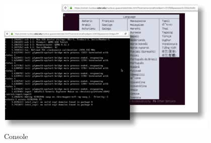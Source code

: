 \begin{figure}[!h]

  \centering 
    \includegraphics[width=1.0\columnwidth]{images/client/Picture5.png} 
    \caption{Console}
    \label{F:5}
\end{figure} 

